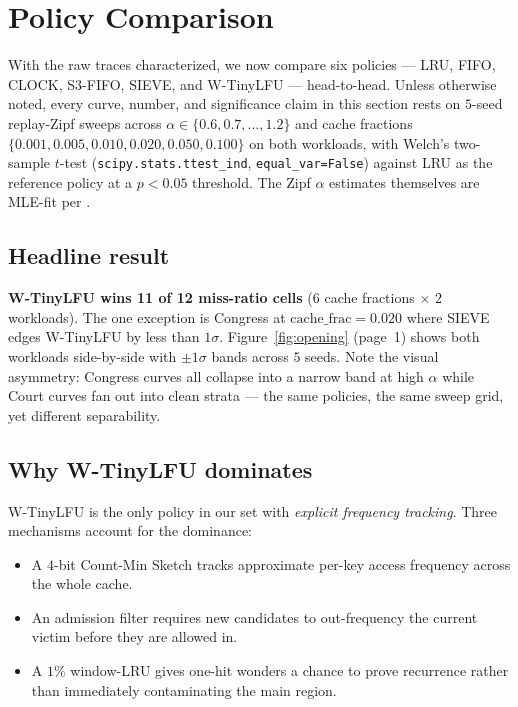 \section{Policy Comparison}\label{sec:policies}

With the raw traces characterized, we now compare six policies --- LRU, FIFO,
CLOCK, S3-FIFO, SIEVE, and W-TinyLFU --- head-to-head. Unless otherwise
noted, every curve, number, and significance claim in this section rests on
$5$-seed replay-Zipf sweeps across $\alpha \in \{0.6, 0.7, \ldots, 1.2\}$ and
cache fractions $\{0.001, 0.005, 0.010, 0.020, 0.050, 0.100\}$ on both
workloads, with Welch's two-sample $t$-test (\texttt{scipy.stats.ttest\_ind},
\texttt{equal\_var=False}) against LRU as the reference policy at a $p < 0.05$
threshold. The Zipf $\alpha$ estimates themselves are MLE-fit per
\cite{clauset2009powerlaw}.

\subsection*{Headline result}

\textbf{W-TinyLFU wins 11 of 12 miss-ratio cells} ($6$ cache fractions
$\times$ $2$ workloads). The one exception is Congress at
$\mathrm{cache\_frac}=0.020$ where SIEVE edges W-TinyLFU by less than $1\sigma$.
Figure~\ref{fig:opening} (page~1) shows both workloads side-by-side with
$\pm 1\sigma$ bands across $5$ seeds. Note the visual asymmetry: Congress
curves all collapse into a narrow band at high $\alpha$ while Court curves
fan out into clean strata --- the same policies, the same sweep grid, yet
different separability.

\subsection*{Why W-TinyLFU dominates}

W-TinyLFU is the only policy in our set with \emph{explicit frequency
tracking}. Three mechanisms account for the dominance:

\begin{itemize}[leftmargin=*,itemsep=0pt,topsep=2pt]
  \item A $4$-bit Count-Min Sketch tracks approximate per-key access
    frequency across the whole cache.
  \item An admission filter requires new candidates to out-frequency the
    current victim before they are allowed in.
  \item A $1\%$ window-LRU gives one-hit wonders a chance to prove
    recurrence rather than immediately contaminating the main region.
\end{itemize}

